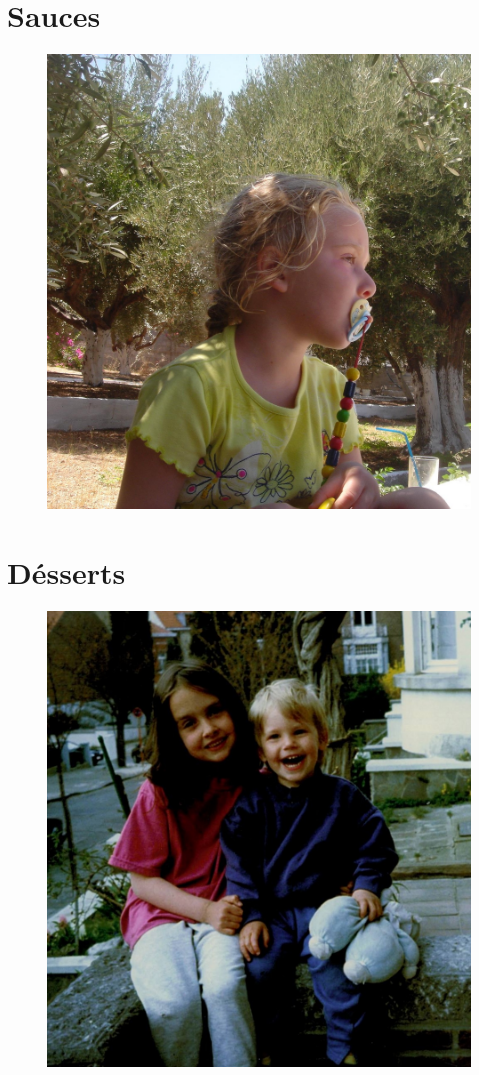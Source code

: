 \documentclass{C:/Users/Simon/Desktop/mamette/cuisine/recipe}
\begin{document}
\chapter{Sauces}
\begin{figure}[h]
\centering
\includegraphics[width=\textwidth]{images/chapter3.jpg}
\end{figure}



\chapter{Désserts}
\begin{figure}[h]
\centering
\includegraphics[width=\textwidth]{images/chapter4.jpg}
\end{figure}


\backmatter
\pagestyle{empty}


\ifodd\thepage\hbox{}\newpage\else\fi%

\end{document}
